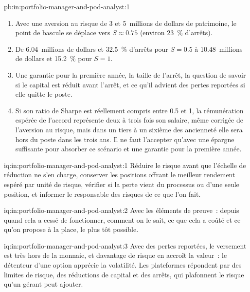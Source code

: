 \begin{solution}{pb:in:portfolio-manager-and-pod-analyst:1}
\begin{enumerate}
\item Avec une aversion au risque de 3 et 5~millions de dollars de patrimoine, le point de bascule se déplace vers $S\approx0.75$ (environ 23~\% d'arrêts).
\item De 6.04~millions de dollars et 32.5~\% d'arrêts pour $S=0.5$ à 10.48~millions de dollars et 15.2~\% pour $S=1$.
\item Une garantie pour la première année, la taille de l'arrêt, la question de savoir si le capital est réduit avant l'arrêt, et ce qu'il advient des pertes
reportées si elle quitte le poste.
\item Si son ratio de Sharpe est réellement compris entre 0.5 et 1, la rémunération espérée de l'accord représente deux à trois fois son salaire, même corrigée de l'aversion
au risque, mais dans un tiers à un sixième des ancienneté elle sera hors du poste dans les trois ans. Il ne faut l'accepter qu'avec une épargne suffisante pour absorber
ce scénario et une garantie pour la première année.
\end{enumerate}
\end{solution}

\begin{solution}{iq:in:portfolio-manager-and-pod-analyst:1}
Réduire le risque avant que l'échelle de réduction ne s'en charge, conserver les positions offrant le meilleur rendement espéré par unité de risque, vérifier
si la perte vient du processus ou d'une seule position, et informer le responsable des risques de ce que l'on fait.
\end{solution}

\begin{solution}{iq:in:portfolio-manager-and-pod-analyst:2}
Avec les éléments de preuve~: depuis quand cela a cessé de fonctionner, comment on le sait, ce que cela a coûté et ce qu'on propose à la place, le plus tôt possible.
\end{solution}

\begin{solution}{iq:in:portfolio-manager-and-pod-analyst:3}
Avec des pertes reportées, le versement est très hors de la monnaie, et davantage de risque en accroît la valeur~: le détenteur d'une option apprécie
la volatilité. Les plateformes répondent par des limites de risque, des réductions de capital et des arrêts, qui plafonnent le risque qu'un gérant peut ajouter.
\end{solution}

